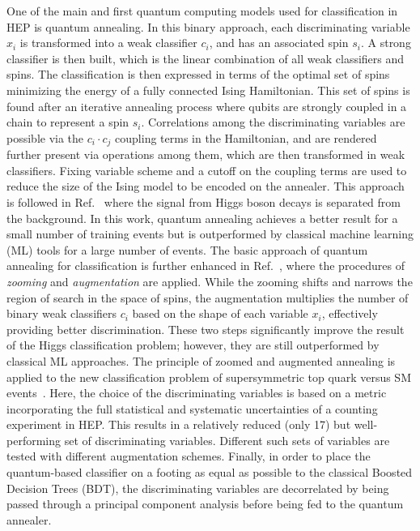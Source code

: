 One of the main and first quantum computing models used for classification in HEP is quantum annealing.
In this binary approach, each discriminating variable $x_i$ is transformed into a weak classifier $c_i$, and has an associated spin $s_i$.
A strong classifier is then built, which is the linear combination of all weak classifiers and spins.
The classification is then expressed in terms of the optimal set of spins minimizing the energy of a fully connected Ising Hamiltonian.
This set of spins is found after an iterative annealing process where qubits are strongly coupled in a chain to represent a spin $s_i$.
Correlations among the discriminating variables are possible via the $c_i \cdot c_j$ coupling terms in the Hamiltonian, and are rendered further present via operations among them, which are then transformed in weak classifiers.
Fixing variable scheme and a cutoff on the coupling terms are used to reduce the size of the Ising model to be encoded on the annealer.
This approach is followed in Ref.~\cite{Mott2017} where the signal from Higgs boson decays is separated from the background.
In this work, quantum annealing achieves a better result for a small number of training events but is outperformed by classical machine learning (ML) tools for a large number of events.
The basic approach of quantum annealing for classification \cite{Mott2017} is further enhanced in Ref.~\cite{qamlz}, where the procedures of \textit{zooming} and \textit{augmentation} are applied.
While the zooming shifts and narrows the region of search in the space of spins, the augmentation multiplies the number of binary weak classifiers $c_i$ based on the shape of each variable $x_i$, effectively providing better discrimination.
These two steps significantly improve the result of the Higgs classification problem; however, they are still outperformed by classical ML approaches.
The principle of zoomed and augmented annealing is applied to the new classification problem of supersymmetric top quark versus SM events~\cite{Bargassa2021}.
Here, the choice of the discriminating variables is based on a metric incorporating the full statistical and systematic uncertainties of a counting experiment in HEP.
This results in a relatively reduced (only 17) but well-performing set of discriminating variables.
Different such sets of variables are tested with different augmentation schemes.
Finally, in order to place the quantum-based classifier on a footing as equal as possible to the classical Boosted Decision Trees (BDT), the discriminating variables are decorrelated by being passed through a principal component analysis before being fed to the quantum annealer.
